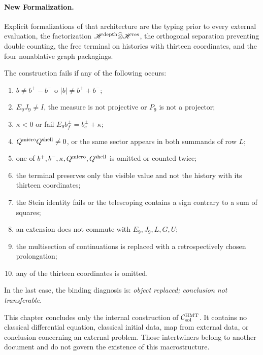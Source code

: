 \paragraph{New Formalization.}
Explicit formalizations of that architecture are the typing prior to every
external evaluation, the factorization
\(\mathscr H^{\rm depth}\widehat\otimes\mathscr H^{\rm res}\), the orthogonal
separation preventing double counting, the free terminal on histories with
thirteen coordinates, and the four nonablative graph packagings.

\begin{criterion}
\label{crit:pdfv2-sol-falsifiers}
The construction fails if any of the following occurs:
\begin{enumerate}
 \item \(b\neq b^+-b^-\) o \(|b|\neq b^++b^-\);
 \item \(E_9J_9\neq I\), the measure is not projective or \(P_9\) is not a
       projector;
 \item \(\kappa<0\) or fail
       \(E_9b_f^\pm=b_c^\pm+\kappa\);
 \item \(Q^{\rm micro}Q^{\rm shell}\neq0\), or the same sector appears in
       both summands of row \(L\);
 \item one of \(b^+,b^-,\kappa,Q^{\rm micro},Q^{\rm shell}\) is omitted or
       counted twice;
 \item the terminal preserves only the visible value and not the
history with its thirteen coordinates;
 \item the Stein identity fails or the telescoping contains a sign
       contrary to a sum of squares;
 \item an extension does not commute with \(E_9,J_9,L,G,U\);
 \item the multisection of continuations is replaced with a retrospectively chosen prolongation;
 \item any of the thirteen coordinates is omitted.
\end{enumerate}
In the last case, the binding diagnosis is: \emph{object replaced;
conclusion not transferable}.
\end{criterion}

\begin{warningbox}
This chapter concludes only the internal construction of
\(\mathcal C_{\rm sol}^{\rm HMT}\). It contains no classical differential
equation, classical initial data, map from external data, or
conclusion concerning an external problem. Those intertwiners belong to another
document and do not govern the existence of this macrostructure.
\end{warningbox}
\fi
